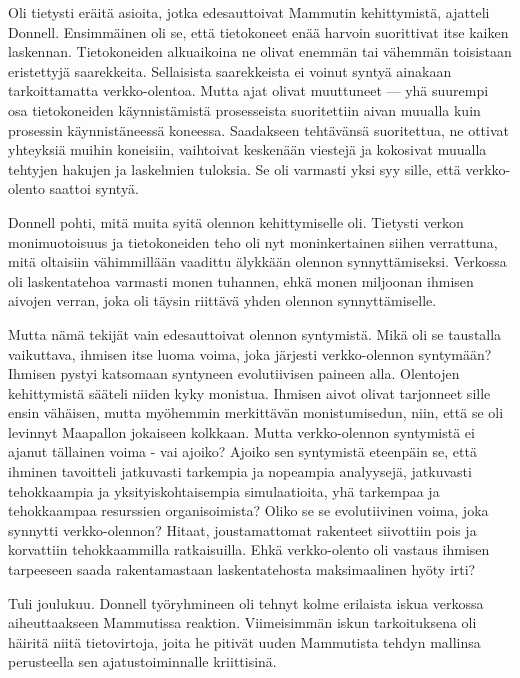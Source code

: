 Oli tietysti eräitä asioita, jotka edesauttoivat Mammutin kehittymistä, ajatteli Donnell. Ensimmäinen oli se, että tietokoneet enää harvoin suorittivat itse kaiken laskennan. Tietokoneiden alkuaikoina ne olivat enemmän tai vähemmän toisistaan eristettyjä saarekkeita. Sellaisista saarekkeista ei voinut syntyä ainakaan tarkoittamatta verkko-olentoa. Mutta ajat olivat muuttuneet --- yhä suurempi osa tietokoneiden käynnistämistä prosesseista suoritettiin aivan muualla kuin prosessin käynnistäneessä koneessa. Saadakseen tehtävänsä suoritettua, ne ottivat yhteyksiä muihin koneisiin, vaihtoivat keskenään viestejä ja kokosivat muualla tehtyjen hakujen ja laskelmien tuloksia. Se oli varmasti yksi syy sille, että verkko-olento saattoi syntyä.


Donnell pohti, mitä muita syitä olennon kehittymiselle oli. Tietysti verkon monimuotoisuus ja tietokoneiden teho oli nyt moninkertainen siihen verrattuna, mitä oltaisiin vähimmillään vaadittu älykkään olennon synnyttämiseksi. Verkossa oli laskentatehoa varmasti monen tuhannen, ehkä monen miljoonan ihmisen aivojen verran, joka oli täysin riittävä yhden olennon synnyttämiselle.


Mutta nämä tekijät vain edesauttoivat olennon syntymistä. Mikä oli se taustalla vaikuttava, ihmisen itse luoma voima, joka järjesti verkko-olennon syntymään? Ihmisen pystyi katsomaan syntyneen evolutiivisen paineen alla. Olentojen kehittymistä sääteli niiden kyky monistua. Ihmisen aivot olivat tarjonneet sille ensin vähäisen, mutta myöhemmin merkittävän monistumisedun, niin, että se oli levinnyt Maapallon jokaiseen kolkkaan. Mutta verkko-olennon syntymistä ei ajanut tällainen voima - vai ajoiko? Ajoiko sen syntymistä eteenpäin se, että ihminen tavoitteli jatkuvasti tarkempia ja nopeampia analyysejä, jatkuvasti tehokkaampia ja yksityiskohtaisempia simulaatioita, yhä tarkempaa ja tehokkaampaa resurssien organisoimista? Oliko se se evolutiivinen voima, joka synnytti verkko-olennon? Hitaat, joustamattomat rakenteet siivottiin pois ja korvattiin tehokkaammilla ratkaisuilla. Ehkä verkko-olento oli vastaus ihmisen tarpeeseen saada rakentamastaan laskentatehosta maksimaalinen hyöty irti?




\psep Tuli joulukuu. Donnell työryhmineen oli tehnyt kolme erilaista iskua verkossa aiheuttaakseen Mammutissa reaktion. Viimeisimmän iskun tarkoituksena oli häiritä niitä tietovirtoja, joita he pitivät uuden Mammutista tehdyn mallinsa perusteella sen ajatustoiminnalle kriittisinä.



